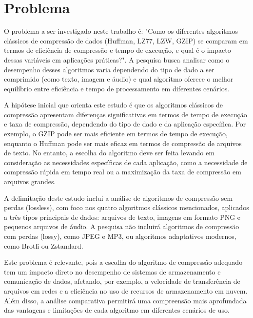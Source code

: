 \chapter{Problema}
\label{c.problema}


O problema a ser investigado neste trabalho é: "Como os diferentes algoritmos clássicos de compressão de dados (Huffman, LZ77, LZW, GZIP) se comparam em termos de eficiência de compressão e tempo de execução, e qual é o impacto dessas variáveis em aplicações práticas?". A pesquisa busca analisar como o desempenho desses algoritmos varia dependendo do tipo de dado a ser comprimido (como texto, imagem e áudio) e qual algoritmo oferece o melhor equilíbrio entre eficiência e tempo de processamento em diferentes cenários.

A hipótese inicial que orienta este estudo é que os algoritmos clássicos de compressão apresentam diferenças significativas em termos de tempo de execução e taxa de compressão, dependendo do tipo de dado e da aplicação específica. Por exemplo, o GZIP pode ser mais eficiente em termos de tempo de execução, enquanto o Huffman pode ser mais eficaz em termos de compressão de arquivos de texto. No entanto, a escolha do algoritmo deve ser feita levando em consideração as necessidades específicas de cada aplicação, como a necessidade de compressão rápida em tempo real ou a maximização da taxa de compressão em arquivos grandes.

A delimitação deste estudo inclui a análise de algoritmos de compressão sem perdas (lossless), com foco nos quatro algoritmos clássicos mencionados, aplicados a três tipos principais de dados: arquivos de texto, imagens em formato PNG e pequenos arquivos de áudio. A pesquisa não incluirá algoritmos de compressão com perdas (lossy), como JPEG e MP3, ou algoritmos adaptativos modernos, como Brotli ou Zstandard.

Este problema é relevante, pois a escolha do algoritmo de compressão adequado tem um impacto direto no desempenho de sistemas de armazenamento e comunicação de dados, afetando, por exemplo, a velocidade de transferência de arquivos em redes e a eficiência no uso de recursos de armazenamento em nuvem. Além disso, a análise comparativa permitirá uma compreensão mais aprofundada das vantagens e limitações de cada algoritmo em diferentes cenários de uso.

